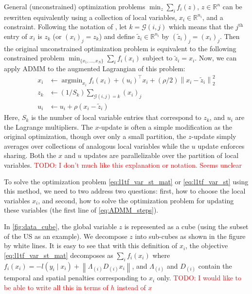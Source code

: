 \documentclass{article}
\DeclareMathOperator*{\argmin}{argmin}
\newcommand{\attn}[1]{\textcolor{red}{TODO: #1}}
\newcommand{\given}{\;\vert\;}
\newcommand{\norm}[1]{\left\lVert #1 \right\rVert}
\begin{document}
General (unconstrained) optimization problems $\min_z
\sum_i f_i(z)$, $z\in\mathbb{R}^n$ can be rewritten equivalently using a
collection of local variables, $x_i\in \mathbb{R}^{n_i}$, and a
constraint. Following the notation of 
\citep{boyd_distributed_2011}, let $k=\mathscr{G}(i,j)$ which
means that the $j^\text{th}$ entry of $x_i$ is $z_k$ (or
$(x_i)_j=z_k$) and define $\tilde{z}_i \in \mathbb{R}^{n_i}$ by
$(\tilde{z}_i)_j=(x_i)_j$. Then the original unconstrained
optimization problem is equivalent to the following constrained
problem
$\min_{\{x_1,...,x_N  \}} \sum_i f_i(x_i)$ subject to $\tilde{z}_i=x_i$.
Now, we can apply ADMM to the augmented Lagrangian of this
problem: 
\begin{align}
x_i&\leftarrow \argmin_{x_i} f_i(x_i) + (u_i)^\top x_i +
     (\rho/2) \norm{ x_i-\tilde{z}_i }_2^2\\
\label{eq:ADMM_steps}
z_k&\leftarrow (1/S_k)\sum_{\mathscr{G}(i,j)=k} (x_i)_j\\
u_i&\leftarrow u_i + \rho (x_i-\tilde{z}_i)
\end{align}
Here, $S_k$ is the number of local variable entries that correspond to
$z_k$, and $u_i$ are the Lagrange multipliers.  The $x$-update is
often a simple modification as the original optimization, though over only a small
partition, the $z$-update simply averages over collections of
analogous local variables while the $u$ update enforces sharing. Both
the $x$ and $u$ updates are parallelizable over the partition of local
variables.
\attn{I don't much like this explanation or notation. Seems unclear}

To solve the optimization problem \eqref{eq:l1tf_var_st_mat} or
\eqref{eq:l1tf_var_st} using this method, we need to two address two
questions: first, how to choose the 
local variables $x_i$, and second, how to solve the optimization
problem for updating these variables (the first line of
\eqref{eq:ADMM_steps}).  

In \autoref{fig:data_cube}, the global variable $z$ is represented
as a cube (using the subset of the US as an example). We decompose $z$
into sub-cubes as shown in the figure by white lines. It is easy to see
that with this definition of $x_i$, the objective
\eqref{eq:l1tf_var_st_mat} decomposes as $\sum_i f_i(x_i)$ where
$f_i(x_i)=-l(y_i\given x_i)+\norm{\Lambda_{(i)} D_{(i)}x_i}$, and
$\Lambda_{(i)}$ and $D_{(i)}$ contain the temporal and spatial
penalties corresponding to $x_i$ only.
\attn{I would like to be able to write all this in terms of $h$
  instead of $x$}
\end{document}
